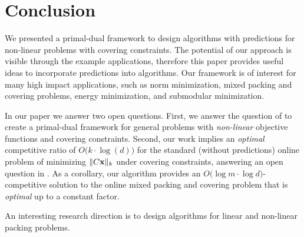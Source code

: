
\section{Conclusion}

We presented a primal-dual framework to design algorithms with predictions for non-linear problems with covering constraints.
The potential of our approach is visible through the example applications, therefore this paper provides useful ideas to incorporate predictions into algorithms.
Our framework is of interest for many high impact applications, such as norm minimization, mixed packing and covering problems, energy minimization, and submodular minimization.

In our paper we answer two open questions.
First, we answer the question of \cite{BamasMaggiori20:The-Primal-Dual-method} to create a primal-dual framework for general problems with \emph{non-linear} objective functions and covering constraints.
Second, our work implies an \emph{optimal} competitive ratio of $O\bigl( k \cdot \log (d)\bigr)$ for the standard (without predictions) online problem of minimizing $\|C \mathbf{x}\|_{k}$ under covering constraints, answering an open question in \cite{NagarajanShen17:Online-Covering}. As a corollary, our algorithm provides an $O\bigl( \log m \cdot \log d \bigr)$-competitive solution to the online mixed packing and covering problem that is \emph{optimal} up to a constant factor.

An interesting research direction is to design algorithms for linear and non-linear packing problems.
